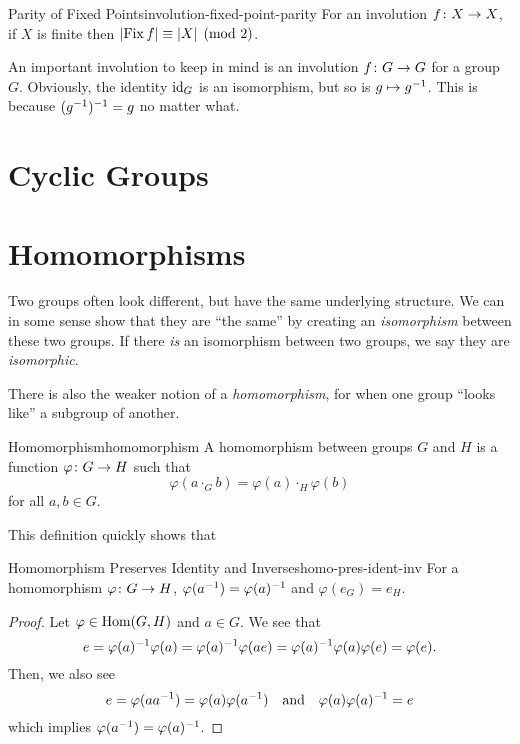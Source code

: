\documentclass{article}
\begin{document}
\begin{proposition}{Parity of Fixed Points}{involution-fixed-point-parity}
  For an involution $f \from X \to X$, if $X$ is finite then
  $\abs{\Fix f} \equiv \abs{X} \pmod{2}$.
\end{proposition}

An important involution to keep in mind is an involution $f \from G \to G$ for a group $G$.
Obviously, the identity $\id[G]$ is an isomorphism, but so is $g \mapsto g\inv$.
This is because $\pars{g\inv}\inv = g$ no matter what.

\section{Cyclic Groups}

\section{Homomorphisms}

Two groups often look different, but have the same underlying structure.
We can in some sense show that they are ``the same'' by creating an \emph{isomorphism}
between these two groups. If there \emph{is} an isomorphism between two groups,
we say they are \emph{isomorphic}.

There is also the weaker notion of a \emph{homomorphism},
for when one group ``looks like'' a subgroup of another.

\begin{definition}{Homomorphism}{homomorphism}
  A homomorphism between groups $G$ and $H$ is a function
  $\varphi \from G \to H$ such that
  \[ \varphi(a \cdot_{G} b) = \varphi(a) \cdot_{H} \varphi(b) \]
  for all $a, b \in G$.
\end{definition}

This definition quickly shows that
\begin{proposition}{Homomorphism Preserves Identity and Inverses}{homo-pres-ident-inv}
  For a homomorphism $\varphi \from G \to H$, $\varphi(a\inv) = \varphi(a)\inv$ and $\varphi(e_{G}) = e_{H}$.
\end{proposition}
\begin{proof}
  Let $\varphi \in \Hom(G, H)$ and $a \in G$. We see that
  \[ e = \varphi(a)\inv \varphi(a) = \varphi(a)\inv \varphi(ae) = \varphi(a)\inv\varphi(a)\varphi(e) = \varphi(e). \]
  Then, we also see
  \[ e = \varphi(aa\inv) = \varphi(a)\varphi(a\inv) \quad \text{and} \quad \varphi(a)\varphi(a)\inv = e \]
  which implies $\varphi(a\inv) = \varphi(a)\inv$.
\end{proof}
\end{document}
